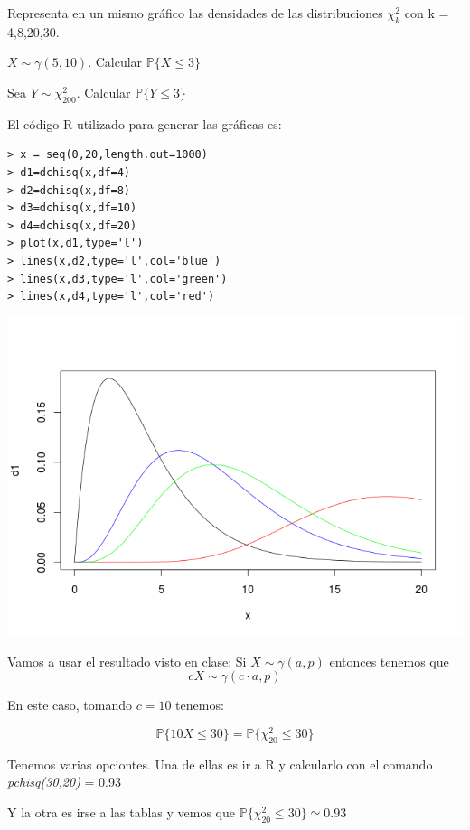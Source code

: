 \begin{problem}[3]

\ppart Representa en un mismo gráfico las densidades de las distribuciones $\chi^2_k $ con k = 4,8,20,30.

\ppart $X \sim \gamma(5,10)$. Calcular $\mathbb{P}\{X\leq 3\}$

\ppart Sea $Y \sim \chi_{200}^2$. Calcular $\mathbb{P}\{Y\leq 3\}$

\solution
\spart
El código R utilizado para generar las gráficas es:

\begin{verbatim}
> x = seq(0,20,length.out=1000)
> d1=dchisq(x,df=4)
> d2=dchisq(x,df=8)
> d3=dchisq(x,df=10)
> d4=dchisq(x,df=20)
> plot(x,d1,type='l')
> lines(x,d2,type='l',col='blue')
> lines(x,d3,type='l',col='green')
> lines(x,d4,type='l',col='red')
\end{verbatim}

\begin{center}
\includegraphics[width=1\textwidth]{Chicuadrado.png}
\label{Ejercicio 4}
\end{center}

\spart
Vamos a usar el resultado visto en clase:
Si $X\sim \gamma(a,p)$ entonces tenemos que 
\[cX \sim \gamma(c\cdot a, p)\]

En este caso, tomando $c=10$ tenemos:

\[\mathbb{P}\{10X\leq 30\} = \mathbb{P}\{\chi^2_{20 }\leq 30\}  \]

Tenemos varias opciontes. Una de ellas es ir a R y calcularlo con el comando \emph{pchisq(30,20)} = 0.93

Y la otra es irse a las tablas y vemos que $\mathbb{P}\{\chi^2_{20} \leq 30\} \simeq 0.93$


\end{problem}
